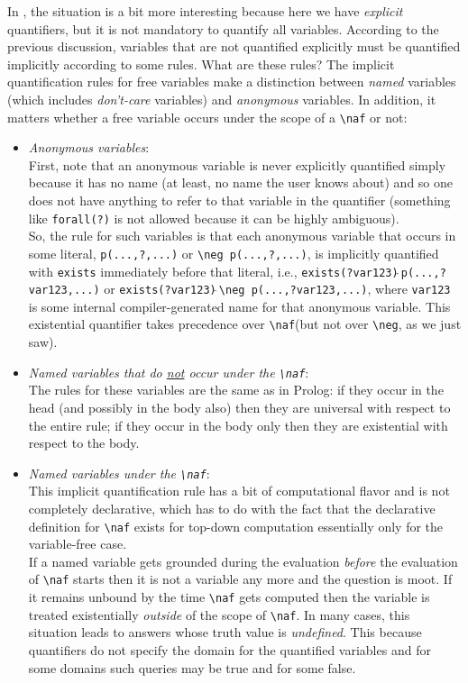 \documentclass[11pt]{article}
\newcommand{\ERGO}{\mbox{\smaller{\ensuremath{\cal{E}}\smaller{{\sc{RGO}}}}}\xspace}
\newcommand{\FLSYSTEM}{\ERGO}
\newcommand{\bs}{\textbackslash}
\newcommand{\RULELOGNAF}{{\texttt{{\bs}naf}}\xspace}
\newcommand{\RULELOGNEG}{{\texttt{{\bs}neg}}\xspace}
\begin{document}
In \FLSYSTEM, the situation is a bit more interesting because here we have
\emph{explicit} quantifiers, but it is not mandatory to quantify all
variables. According to the previous discussion,
variables that are not quantified explicitly must be
quantified implicitly according to some rules. What are these rules?
The implicit quantification rules for free variables
make a distinction between \emph{named}
variables (which includes \emph{don't-care} variables) and \emph{anonymous}
variables. In addition, it matters whether a free variable occurs under the
scope of a \RULELOGNAF or not:
\begin{itemize}
\item  \emph{Anonymous variables}:\\
  First, note that an anonymous variable is never explicitly quantified
  simply because it has no name (at least, no name the user knows about)
  and so one does not have anything to refer to that variable in the
  quantifier (something like \texttt{forall(?)} is not allowed because it
  can be highly ambiguous).
  \\
  So, the rule for such variables is that each anonymous variable
  that occurs in some literal, \texttt{p(...,?,...)} or 
  \texttt{\RULELOGNEG p(...,?,...)}, 
  is implicitly quantified with \texttt{exists} immediately before that
  literal, i.e., \texttt{exists(?var123)$\hat{~}$p(...,?var123,...)}
  or \texttt{exists(?var123)$\hat{~}$\RULELOGNEG p(...,?var123,...)}, where
  \texttt{var123} is some internal compiler-generated
  name for that anonymous variable. This existential quantifier takes
  precedence over \RULELOGNAF (but not over \RULELOGNEG, as we just saw).
\item \emph{Named variables that do \underline{not} occur under the \RULELOGNAF}:\\
  The rules for these variables are the same as in Prolog: if they occur
  in the head (and possibly in the body also)
  then they are universal with respect to the entire rule; if
  they occur in the body only then they are existential with respect to the
  body.
\item \emph{Named variables under the \RULELOGNAF}:\\
  This implicit quantification rule has a bit of computational flavor and is
  not completely
  declarative, which has to do with the fact that the declarative
  definition for \RULELOGNAF  exists for top-down computation essentially
  only for the variable-free case.\\
  If a named variable gets grounded during the evaluation \emph{before}
  the evaluation of
  \RULELOGNAF starts then it is not a variable any more and the question is
  moot. If it remains unbound by the time \RULELOGNAF gets computed then 
  the variable
  is treated existentially \emph{outside} of the scope of \RULELOGNAF.
  In many cases, this situation leads to answers whose truth value is
  \emph{undefined}. This because \FLSYSTEM quantifiers do not specify the
  domain for the quantified variables and for some domains
  such queries may be true and for some false.
\end{itemize}
\end{document}
